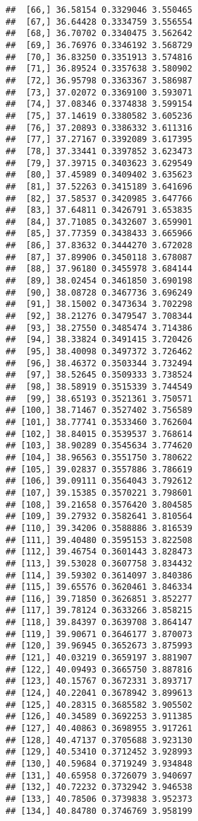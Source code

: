 \documentclass[]{book}
\theoremstyle{definition}
\theoremstyle{definition}
\theoremstyle{definition}
\theoremstyle{remark}
\begin{document}
\begin{verbatim}
##  [66,] 36.58154 0.3329046 3.550465
##  [67,] 36.64428 0.3334759 3.556554
##  [68,] 36.70702 0.3340475 3.562642
##  [69,] 36.76976 0.3346192 3.568729
##  [70,] 36.83250 0.3351913 3.574816
##  [71,] 36.89524 0.3357638 3.580902
##  [72,] 36.95798 0.3363367 3.586987
##  [73,] 37.02072 0.3369100 3.593071
##  [74,] 37.08346 0.3374838 3.599154
##  [75,] 37.14619 0.3380582 3.605236
##  [76,] 37.20893 0.3386332 3.611316
##  [77,] 37.27167 0.3392089 3.617395
##  [78,] 37.33441 0.3397852 3.623473
##  [79,] 37.39715 0.3403623 3.629549
##  [80,] 37.45989 0.3409402 3.635623
##  [81,] 37.52263 0.3415189 3.641696
##  [82,] 37.58537 0.3420985 3.647766
##  [83,] 37.64811 0.3426791 3.653835
##  [84,] 37.71085 0.3432607 3.659901
##  [85,] 37.77359 0.3438433 3.665966
##  [86,] 37.83632 0.3444270 3.672028
##  [87,] 37.89906 0.3450118 3.678087
##  [88,] 37.96180 0.3455978 3.684144
##  [89,] 38.02454 0.3461850 3.690198
##  [90,] 38.08728 0.3467736 3.696249
##  [91,] 38.15002 0.3473634 3.702298
##  [92,] 38.21276 0.3479547 3.708344
##  [93,] 38.27550 0.3485474 3.714386
##  [94,] 38.33824 0.3491415 3.720426
##  [95,] 38.40098 0.3497372 3.726462
##  [96,] 38.46372 0.3503344 3.732494
##  [97,] 38.52645 0.3509333 3.738524
##  [98,] 38.58919 0.3515339 3.744549
##  [99,] 38.65193 0.3521361 3.750571
## [100,] 38.71467 0.3527402 3.756589
## [101,] 38.77741 0.3533460 3.762604
## [102,] 38.84015 0.3539537 3.768614
## [103,] 38.90289 0.3545634 3.774620
## [104,] 38.96563 0.3551750 3.780622
## [105,] 39.02837 0.3557886 3.786619
## [106,] 39.09111 0.3564043 3.792612
## [107,] 39.15385 0.3570221 3.798601
## [108,] 39.21658 0.3576420 3.804585
## [109,] 39.27932 0.3582641 3.810564
## [110,] 39.34206 0.3588886 3.816539
## [111,] 39.40480 0.3595153 3.822508
## [112,] 39.46754 0.3601443 3.828473
## [113,] 39.53028 0.3607758 3.834432
## [114,] 39.59302 0.3614097 3.840386
## [115,] 39.65576 0.3620461 3.846334
## [116,] 39.71850 0.3626851 3.852277
## [117,] 39.78124 0.3633266 3.858215
## [118,] 39.84397 0.3639708 3.864147
## [119,] 39.90671 0.3646177 3.870073
## [120,] 39.96945 0.3652673 3.875993
## [121,] 40.03219 0.3659197 3.881907
## [122,] 40.09493 0.3665750 3.887816
## [123,] 40.15767 0.3672331 3.893717
## [124,] 40.22041 0.3678942 3.899613
## [125,] 40.28315 0.3685582 3.905502
## [126,] 40.34589 0.3692253 3.911385
## [127,] 40.40863 0.3698955 3.917261
## [128,] 40.47137 0.3705688 3.923130
## [129,] 40.53410 0.3712452 3.928993
## [130,] 40.59684 0.3719249 3.934848
## [131,] 40.65958 0.3726079 3.940697
## [132,] 40.72232 0.3732942 3.946538
## [133,] 40.78506 0.3739838 3.952373
## [134,] 40.84780 0.3746769 3.958199

\end{verbatim}
\end{document}
